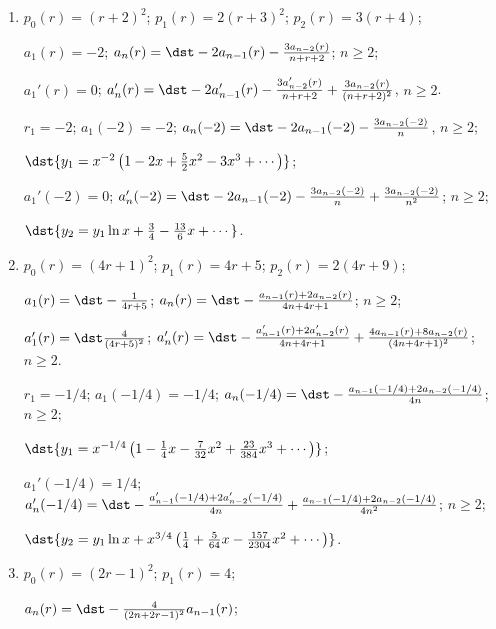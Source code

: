 \documentclass[openany]{book}
\newenvironment{sectionSolutions}{
 \begin{enumerate}[item-label={\thesection.\arabic{enumi}.}]
}{
 \end{enumerate}
}
\begin{document}
\begin{sectionSolutions}
$r_1=-1/3$;
$a_1(-1/3)=-1$;
$a_n(-1/3)=\dst
\frac{-3a_{n-1}(-1/3)+2a_{n-2}(-1/3)}{3n}$,
$n\ge2$;

$\dst{y_1=x^{-1/3}\left(1-x+\frac{5}{6}x^2-\frac{1}{2}x^3+\cdots\right)}$;

$a_1'(-1/3)=1$;
$a_n'(-1/3)=\dst
\frac{-3a_{n-1}'(r)+2a_{n-2}'(r)}{3n}
+\frac{3a_{n-1}(r)-2a_{n-2}(r)}{3n^2}$;
$n\ge2$;

$\dst{y_2=
y_1\ln x+x^{2/3}\left(1-\frac{11}{12}x+\frac{25}{36}x^2+
\cdots\right)}$.


\item
$p_0(r)=(r+2)^2$;
$p_1(r)=2(r+3)^2$;
$p_2(r)=3(r+4)$;

$a_1(r)=-2$;
$a_n(r)=\dst
-2a_{n-1}(r)-\frac{3a_{n-2}(r)}{ n+r+2}$;
$n\ge2$;


$a_1'(r)=0$;
$a_n'(r)=\dst
-2a_{n-1}'(r)-\frac{3a_{n-2}'(r)}{ n+r+2}
+\frac{3a_{n-2}(r)}{(n+r+2)^2}$,
$n\ge2$.

$r_1=-2$;
$a_1(-2)=-2$;
$a_n(-2)=\dst
-2a_{n-1}(-2)-\frac{3a_{n-2}(-2)}{ n}$,
$n\ge2$;

$\dst{y_1=x^{-2}\left(1-2x+\frac{5}{2}x^2-3x^3+\cdots\right)}$;

$a_1'(-2)=0$;
$a_n'(-2)=\dst
-2a_{n-1}(-2)-\frac{3a_{n-2}(-2)}{ n}+\frac{3a_{n-2}(-2)}{ n^2}$;
$n\ge2$;

$\dst{y_2=y_1\ln x+\frac{3}{4}-\frac{13}{6}x+\cdots}$.


\item
$p_0(r)=(4r+1)^2$;
$p_1(r)=4r+5$;
$p_2(r)=2(4r+9)$;

$a_1(r)=\dst-\frac{1}{4r+5}$;
$a_n(r)=\dst
-\frac{a_{n-1}(r)+2a_{n-2}(r)}{4n+4r+1}$;
$n\ge2$;


$a_1'(r)=\dst\frac{4}{(4r+5)^2}$;
$a_n'(r)=\dst
-\frac{a_{n-1}'(r)+2a_{n-2}'(r)}{4n+4r+1}
+\frac{4a_{n-1}(r)+8a_{n-2}(r)}{(4n+4r+1)^2}$;
$n\ge2$.


$r_1=-1/4$;
$a_1(-1/4)=-1/4$;
$a_n(-1/4)=\dst
-\frac{a_{n-1}(-1/4)+2a_{n-2}(-1/4)}{4n}$;
$n\ge2$;

$\dst{y_1=x^{-1/4}\left(1-\frac{1}{4}x-\frac{7}{32}x^2+\frac{23}{384}x^3
+\cdots\right)}$;

$a_1'(-1/4)=1/4$;
$a_n'(-1/4)=\dst
-\frac{a_{n-1}'(-1/4)+2a_{n-2}'(-1/4)}{4n}
+\frac{a_{n-1}(-1/4)+2a_{n-2}(-1/4)}{4n^2}$;
$n\ge2$;

$\dst{y_2=
y_1\ln x+x^{3/4}\left(\frac{1}{4}+\frac{5}{64}x-\frac{157}{2304}x^2
+\cdots\right)}$.


\item
$p_0(r)=(2r-1)^2$;
$p_1(r)=4$;

$a_n(r)=\dst-\frac{4}{(2n+2r-1)^2}a_{n-1}(r)$;


\end{sectionSolutions}
\end{document}
